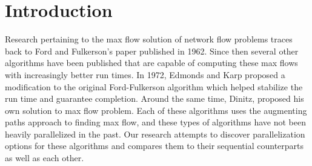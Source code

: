 \section{Introduction}

Research pertaining to the max flow solution of network flow problems traces back to Ford and Fulkerson's paper published in 1962. Since then several other algorithms have been published that are capable of computing these max flows with increasingly better run times. In 1972, Edmonds and Karp proposed a modification to the original Ford-Fulkerson algorithm which helped stabilize the run time and guarantee completion. Around the same time, Dinitz, proposed his own solution to max flow problem. Each of these algorithms uses the augmenting paths approach to finding max flow, and these types of algorithms have not been heavily parallelized in the past. Our research attempts to discover parallelization options for these algorithms and compares them to their sequential counterparts as well as each other.